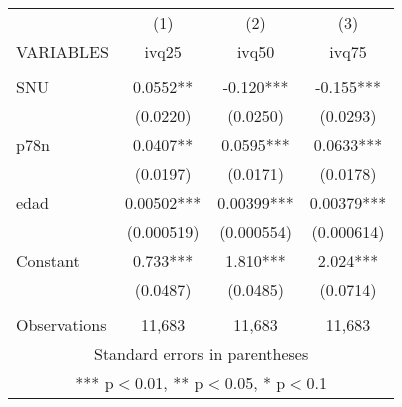 \begin{tabular}{lccc} \hline
 & (1) & (2) & (3) \\
VARIABLES & ivq25 & ivq50 & ivq75 \\ \hline
 &  &  &  \\
SNU & 0.0552** & -0.120*** & -0.155*** \\
 & (0.0220) & (0.0250) & (0.0293) \\
p78n & 0.0407** & 0.0595*** & 0.0633*** \\
 & (0.0197) & (0.0171) & (0.0178) \\
edad & 0.00502*** & 0.00399*** & 0.00379*** \\
 & (0.000519) & (0.000554) & (0.000614) \\
Constant & 0.733*** & 1.810*** & 2.024*** \\
 & (0.0487) & (0.0485) & (0.0714) \\
 &  &  &  \\
 Observations & 11,683 & 11,683 & 11,683 \\ \hline
\multicolumn{4}{c}{ Standard errors in parentheses} \\
\multicolumn{4}{c}{ *** p$<$0.01, ** p$<$0.05, * p$<$0.1} \\
\end{tabular}
